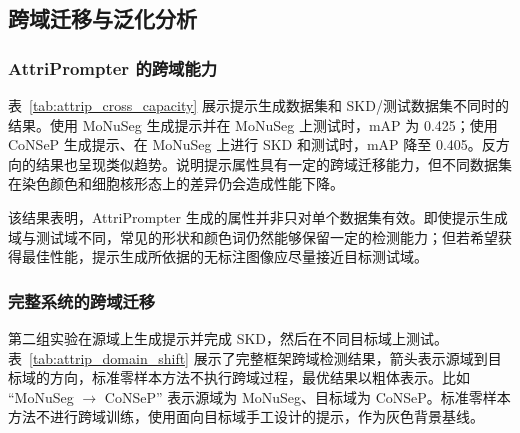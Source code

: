 \subsection{跨域迁移与泛化分析}

\subsubsection{AttriPrompter 的跨域能力}

表~\ref{tab:attrip_cross_capacity} 展示提示生成数据集和 SKD/测试数据集不同时的结果。使用 MoNuSeg 生成提示并在 MoNuSeg 上测试时，mAP 为 0.425；使用 CoNSeP 生成提示、在 MoNuSeg 上进行 SKD 和测试时，mAP 降至 0.405。反方向的结果也呈现类似趋势。说明提示属性具有一定的跨域迁移能力，但不同数据集在染色颜色和细胞核形态上的差异仍会造成性能下降。

\begin{table}[t]
\caption{AttriPrompter 跨域检测结果}
\label{tab:attrip_cross_capacity}
\begin{center}
\end{center}
\vskip -0.15in
\end{table}

该结果表明，AttriPrompter 生成的属性并非只对单个数据集有效。即使提示生成域与测试域不同，常见的形状和颜色词仍然能够保留一定的检测能力；但若希望获得最佳性能，提示生成所依据的无标注图像应尽量接近目标测试域。

\subsubsection{完整系统的跨域迁移}

第二组实验在源域上生成提示并完成 SKD，然后在不同目标域上测试。表~\ref{tab:attrip_domain_shift} 展示了完整框架跨域检测结果，箭头表示源域到目标域的方向，标准零样本方法不执行跨域过程，最优结果以粗体表示。比如 ``MoNuSeg $\rightarrow$ CoNSeP'' 表示源域为 MoNuSeg、目标域为 CoNSeP。标准零样本方法不进行跨域训练，使用面向目标域手工设计的提示，作为灰色背景基线。


